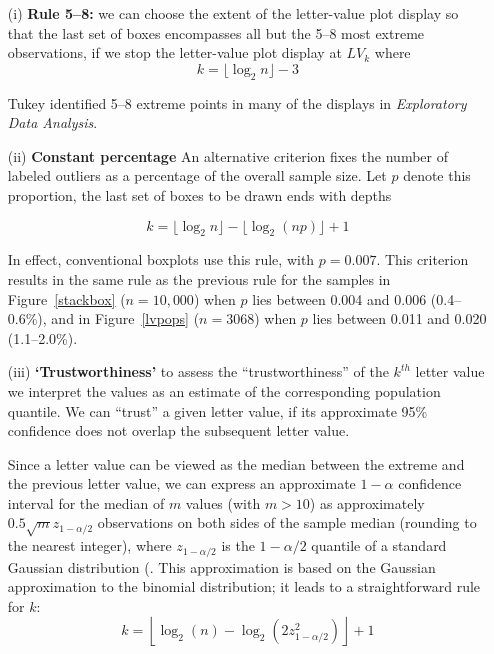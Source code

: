 \documentclass[12pt,oneside]{article}
\begin{document}
\begin{enumerate}
\item[(i)]{\bf Rule 5--8:}
we can choose the extent of the letter-value plot display so that the last set of boxes encompasses all but the 5--8 most extreme observations, if we stop the letter-value plot display at $LV_k$ where 
%
\begin{equation}
k = \lfloor \log_2 n \rfloor - 3
\end{equation}
%

\noindent Tukey identified 5--8 extreme points  in many of the displays in \textit{Exploratory Data Analysis}.

\item[(ii)]{\bf Constant percentage}
An alternative criterion fixes the number of labeled outliers as a percentage of the overall sample size.
 Let $p$ denote this proportion, the last set of boxes to be drawn ends with depths

\begin{equation}
k = \lfloor \log_2 n \rfloor - \lfloor \log_2 (np) \rfloor + 1
\end{equation}

\noindent In effect, conventional boxplots use this rule, with $p = 0.007$. This criterion results in the same rule as the previous rule for the samples in Figure~\ref{stackbox} ($n = 10,000$) when $p$ lies between 0.004 and 0.006 (0.4--0.6\%), and in Figure~\ref{lvpops} ($n = 3068$) when $p$ lies between 0.011 and 0.020 (1.1--2.0\%).

\item[(iii)] {\bf  `Trustworthiness'}
to assess the ``trustworthiness'' of the $k^{th}$ letter value we interpret the values as an estimate of the corresponding population quantile. We can ``trust''  a given letter value, if  its approximate 95\% confidence does not overlap the subsequent letter value.

Since a letter value can be viewed as the median between the extreme and the previous letter value, we can express an approximate $1-\alpha$ confidence interval for the median of $m$ values (with $m > 10$) as approximately $0.5 \sqrt{m} z_{1-\alpha/2}$ observations on both sides of the sample median (rounding to the nearest integer), where $z_{1-\alpha/2}$ is the ${1-\alpha/2}$ quantile of a standard Gaussian distribution (\citet[161]{ha.order}. This approximation is based on the Gaussian approximation to the binomial distribution; it leads to a straightforward rule for $k$:
\begin{equation}
k =  \left \lfloor \log_2 (n) - \log_2 
   \left(2  z_{1-\alpha/2}^2 \right) \right \rfloor + 1
\end{equation}


\end{enumerate}
\end{document}
